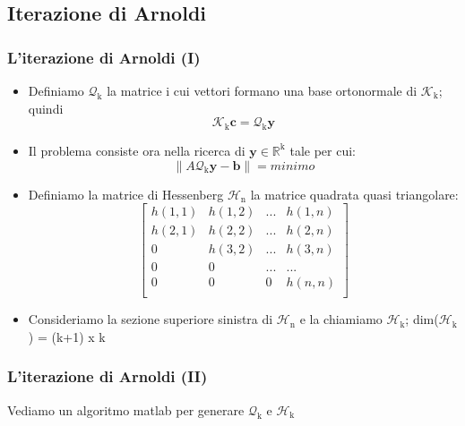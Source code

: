 \documentclass[10pt]{beamer}
\begin{document}
\subsection{Iterazione di Arnoldi}
\begin{frame} \frametitle{L'iterazione di Arnoldi (I)}
\begin{itemize}
    
\item  Definiamo $\mathcal{Q}_\mathrm{k}$ la matrice i cui vettori formano una \alert{base ortonormale} di $\mathcal{K}_\mathrm{k}$; quindi $$\mathcal{K}_\mathrm{k}\mathbf{c} = \mathcal{Q}_\mathrm{k}\mathbf{y}$$
\item   Il problema consiste ora nella ricerca di $\mathbf{y}\in\mathbb{R}^\mathrm{k}$ tale per cui: $$\|A\mathcal{Q}_\mathrm{k}\mathbf{y}-\mathbf{b}\| = minimo$$
\item Definiamo la matrice di Hessenberg $\mathcal{H}_\mathrm{n}$ la matrice quadrata quasi triangolare: $$\begin{bmatrix} h(1,1) & h(1,2) & ... & h(1,n) \\ h(2,1) & h(2,2) & ... & h(2,n) \\0 & h(3,2) & ... & h(3,n) \\ 0 & 0 & ... & ... \\  0& 0&0& h(n,n) \\ \end{bmatrix}$$
\item Consideriamo la sezione superiore sinistra di $\mathcal{H}_\mathrm{n}$ e la chiamiamo $\mathcal{H}_\mathrm{k}$; dim($\mathcal{H}_\mathrm{k}$) = (k+1) x k
\end{itemize}
\end{frame}

\begin{frame}\frametitle{L'iterazione di Arnoldi (II)}

Vediamo un algoritmo matlab per generare  $\mathcal{Q}_\mathrm{k}$ e $\mathcal{H}_\mathrm{k}$ \\ 

\end{frame}
\end{document}
